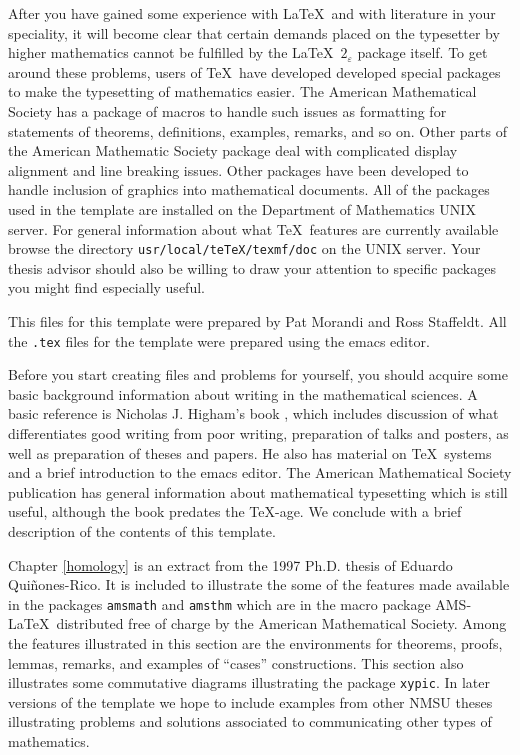 After you have gained some experience with \LaTeX\ and with literature 
in your speciality, it will become clear that certain demands placed
on the typesetter by higher mathematics cannot be fulfilled by the 
\LaTeX\ $2_{\varepsilon}$
package itself.  To get around these problems, 
users of \TeX\ have developed developed special packages 
to make the typesetting of mathematics easier.  
The American Mathematical Society has a package of macros to handle
such issues as formatting for statements of theorems, definitions,
examples, remarks, and so on.  Other parts of the American Mathematic
Society package deal with complicated  display alignment and line
breaking issues.  Other packages have been developed to handle
inclusion of graphics into mathematical documents.  
All of the packages used in the template are installed on the
Department of Mathematics UNIX server.  For general information about
what \TeX\ features are currently available browse the directory
{\tt usr/local/teTeX/texmf/doc} on the UNIX server.
Your thesis advisor should also be willing to draw your attention to
specific packages you might find especially useful.


This files for this template were prepared by Pat Morandi and Ross Staffeldt.
All the {\tt .tex} files for the template were prepared using the
emacs editor.  

Before you start creating files and problems for yourself, you should
acquire some basic background information about writing in the
mathematical sciences.  A basic reference is Nicholas J. Higham's book
\cite{Higham}, which includes discussion of what differentiates good
writing from poor writing, preparation of talks and posters, as well
as preparation of theses and papers.  He also has material on 
\TeX\ systems and a brief introduction to the emacs editor.  
The American Mathematical Society publication 
\cite{Swanson} has general information about mathematical typesetting
which is still useful, although the book predates the \TeX-age.
We conclude with a brief description of the contents of this template.

Chapter \ref{homology} is an extract from the 1997 Ph.D. thesis of
Eduardo Qui\~nones-Rico.  It is included to illustrate the some of the 
features made available in the packages 
{\tt amsmath} and {\tt amsthm}
which are in the macro package AMS-\LaTeX\ distributed free of charge
by the American Mathematical Society.  Among the features illustrated
in this section are the environments for theorems, proofs, lemmas,
remarks, and examples of ``cases'' constructions.   This section also 
illustrates some commutative diagrams illustrating the package {\tt xypic}.
In later versions of the template we hope to include examples from
other NMSU theses illustrating problems and solutions associated to
communicating other types of mathematics.

